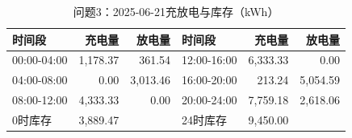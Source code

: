 \begin{table}[H]\centering\small\caption{问题3：2025-06-21充放电与库存（kWh）}\label{tab:q320250621b}
\begin{tabular}{lrrlrr}\toprule
时间段 & 充电量 & 放电量 & 时间段 & 充电量 & 放电量\\\midrule
00:00-04:00 & 1,178.37 & 361.54 & 12:00-16:00 & 6,333.33 & 0.00\\
04:00-08:00 & 0.00 & 3,013.46 & 16:00-20:00 & 213.24 & 5,054.59\\
08:00-12:00 & 4,333.33 & 0.00 & 20:00-24:00 & 7,759.18 & 2,618.06\\
0时库存 & 3,889.47 &  & 24时库存 & 9,450.00 & \\
\bottomrule\end{tabular}\end{table}
